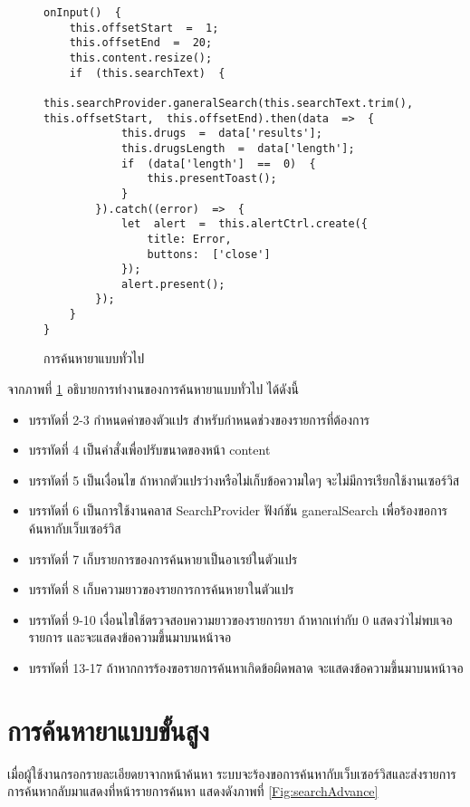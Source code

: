 	\begin{figure}[H]
		{\begin{lstlisting}
onInput()  {        
	this.offsetStart  =  1;        
	this.offsetEnd  =  20;        
	this.content.resize();        
	if  (this.searchText)  {            
		this.searchProvider.ganeralSearch(this.searchText.trim(),  this.offsetStart,  this.offsetEnd).then(data  =>  {     
			this.drugs  =  data['results'];                
			this.drugsLength  =  data['length'];          
			if  (data['length']  ==  0)  {          
				this.presentToast();          
			}      
		}).catch((error)  =>  {          
			let  alert  =  this.alertCtrl.create({                    
				title: Error,  
				buttons:  ['close']          
			});          
			alert.present();     
		});    
	}   
}		
		\end{lstlisting}}
		\caption{การค้นหายาแบบทั่วไป}
		\label{Fig:searchGeneral}
	\end{figure}
	จากภาพที่ \ref{Fig:searchGeneral} อธิบายการทำงานของการค้นหายาแบบทั่วไป ได้ดังนี้
	\begin{itemize}[label={--}]
		\item บรรทัดที่  2-3 	กำหนดค่าของตัวแปร สำหรับกำหนดช่วงของรายการที่ต้องการ
		\item บรรทัดที่  4	เป็นคำสั่งเพื่อปรับขนาดของหน้า content
		\item บรรทัดที่  5	เป็นเงื่อนไข ถ้าหากตัวแปรว่างหรือไม่เก็บข้อความใดๆ จะไม่มีการเรียกใช้งานเซอร์วิส
		\item บรรทัดที่  6	เป็นการใช้งานคลาส SearchProvider ฟังก์ชัน ganeralSearch เพื่อร้องขอการค้นหากับเว็บเซอร์วิส 
		\item บรรทัดที่  7	เก็บรายการของการค้นหายาเป็นอาเรย์ในตัวแปร
		\item บรรทัดที่  8	เก็บความยาวของรายการการค้นหายาในตัวแปร
		\item บรรทัดที่  9-10	เงื่อนไขใช้ตรวจสอบความยาวของรายการยา ถ้าหากเท่ากับ 0 แสดงว่าไม่พบเจอรายการ และจะแสดงข้อความขึ้นมาบนหน้าจอ
		\item บรรทัดที่  13-17	ถ้าหากการร้องขอรายการค้นหาเกิดข้อผิดพลาด จะแสดงข้อความขึ้นมาบนหน้าจอ
	\end{itemize}

\section{การค้นหายาแบบขั้นสูง}
	เมื่อผู้ใช้งานกรอกรายละเอียดยาจากหน้าค้นหา 
	ระบบจะร้องขอการค้นหากับเว็บเซอร์วิสและส่งรายการการค้นหากลับมาแสดงที่หน้ารายการค้นหา 
	แสดงดังภาพที่ \ref{Fig:searchAdvance}

